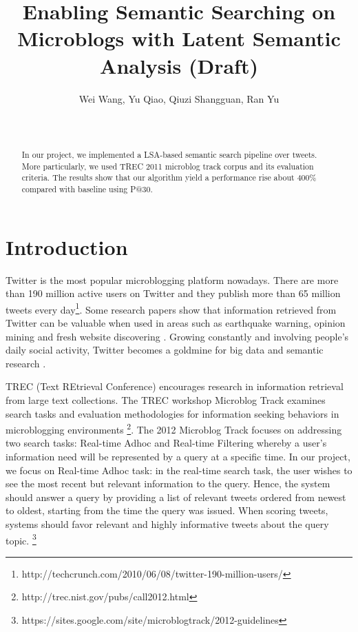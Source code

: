 \documentclass{acm_proc_article-sp}
\begin{document}
\title{Enabling Semantic Searching on Microblogs with Latent Semantic Analysis (Draft) 
}


\author{\alignauthor Wei Wang, Yu Qiao, Qiuzi Shangguan, Ran Yu \\
 \\ 
 \\
} 
\maketitle

\begin{abstract}
In our project, we implemented a LSA-based semantic search pipeline over tweets. More particularly, we used TREC 2011 microblog track corpus and its evaluation criteria. The results show that our algorithm yield a performance rise about 400\% compared with baseline using P@30. 
\end{abstract}

\section{Introduction}
Twitter is the most popular microblogging platform nowadays. There are more than 190 million active users on Twitter and they publish more than 65 million tweets every day\footnote{http://techcrunch.com/2010/06/08/twitter-190-million-users/}. Some research papers show that information retrieved from Twitter can be valuable when used in areas such as earthquake warning\cite{sakaki2010earthquake}, opinion mining\cite{gaffney2010iranelection} and fresh website discovering \cite{dong2010time}. Growing constantly and involving people's daily social activity, Twitter becomes a goldmine for big data and semantic research\cite{abel2011semantic} .

TREC (Text REtrieval Conference) encourages research in information retrieval from large text collections. The TREC workshop Microblog Track examines search tasks and evaluation methodologies for information seeking behaviors in microblogging environments \footnote{http://trec.nist.gov/pubs/call2012.html}. The 2012 Microblog Track focuses on addressing two search tasks: Real-time Adhoc and Real-time Filtering whereby a user's information need will be represented by a query at a specific time. In our project, we focus on Real-time Adhoc task: in the real-time search task, the user wishes to see the most recent but relevant information to the query. Hence, the system should answer a query by providing a list of relevant tweets ordered from newest to oldest, starting from the time the query was issued. When scoring tweets, systems should favor relevant and highly informative tweets about the query topic. \footnote{https://sites.google.com/site/microblogtrack/2012-guidelines}
\end{document}
